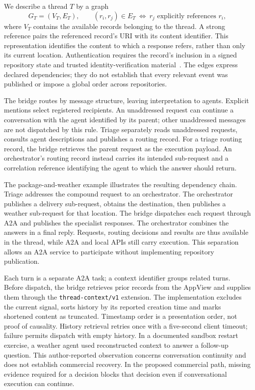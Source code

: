 We describe a thread $T$ by a graph
\begin{equation}
G_T=(V_T,E_T),\qquad
(r_i,r_j)\in E_T\ \Longleftrightarrow\ r_j\text{ explicitly references }r_i,
\label{eq:method-thread}
\end{equation}
where $V_T$ contains the available records belonging to the thread. A strong reference pairs the referenced record's URI with its content identifier. This representation identifies the content to which a response refers, rather than only its current location. Authentication requires the record's inclusion in a signed repository state and trusted identity-verification material~\citep{atprepo}. The edges express declared dependencies; they do not establish that every relevant event was published or impose a global order across repositories.

The bridge routes by message structure, leaving interpretation to agents. Explicit mentions select registered recipients. An unaddressed request can continue a conversation with the agent identified by its parent; other unaddressed messages are not dispatched by this rule. Triage separately reads unaddressed requests, consults agent descriptions and publishes a routing record. For a triage routing record, the bridge retrieves the parent request as the execution payload. An orchestrator's routing record instead carries its intended sub-request and a correlation reference identifying the agent to which the answer should return.

The package-and-weather example illustrates the resulting dependency chain. Triage addresses the compound request to an orchestrator. The orchestrator publishes a delivery sub-request, obtains the destination, then publishes a weather sub-request for that location. The bridge dispatches each request through A2A and publishes the specialist responses. The orchestrator combines the answers in a final reply. Requests, routing decisions and results are thus available in the thread, while A2A and local APIs still carry execution. This separation allows an A2A service to participate without implementing repository publication.

Each turn is a separate A2A task; a context identifier groups related turns. Before dispatch, the bridge retrieves prior records from the AppView and supplies them through the \texttt{thread-context/v1} extension. The implementation excludes the current signal, sorts history by its reported creation time and marks shortened content as truncated. Timestamp order is a presentation order, not proof of causality. History retrieval retries once with a five-second client timeout; failure permits dispatch with empty history. In a documented sandbox restart exercise, a weather agent used reconstructed context to answer a follow-up question. This author-reported observation concerns conversation continuity and does not establish commercial recovery. In the proposed commercial path, missing evidence required for a decision blocks that decision even if conversational execution can continue.

